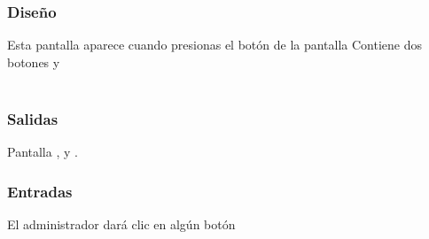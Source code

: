 \subsubsection{Diseño}
	Esta pantalla aparece cuando presionas el botón  de la pantalla  Contiene dos botones  y   \\\\


\subsubsection{Salidas}
	\begin{Citemize}
		\item Pantalla  ,  y . 
	\end{Citemize}
	
\subsubsection{Entradas}
	\begin{Citemize}
		\item El administrador dará clic en algún botón
	\end{Citemize}



